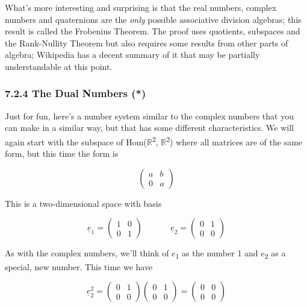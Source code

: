 \documentclass[oneside,english]{amsbook}
\numberwithin{section}{chapter}
\theoremstyle{plain}
\theoremstyle{definition}
\begin{document}
What's more interesting and surprising is that the real numbers, complex
numbers and quaternions are the \emph{only} possible associative
division algebras; this result is called the Frobenius Theorem. The
proof uses quotients, subspaces and the Rank-Nullity Theorem but also
requires some results from other parts of algebra; Wikipedia has a
decent summary of it that may be partially understandable at this point.

\subsubsection{7.2.4 The Dual Numbers (*)}\label{the-dual-numbers}

Just for fun, here's a number system similar to the complex numbers that
you can make in a similar way, but that has some different
characteristics. We will again start with the subspace of
Hom($\mathbb{R}$\textsuperscript{2}, $\mathbb{R}$\textsuperscript{2}) where
all matrices are of the same form, but this time the form is

\[\begin{pmatrix}
	a & b \\
	0 & a
\end{pmatrix}\]

This is a two-dimensional space with basis

\[{\underline{e}}_{1} = \begin{pmatrix}
	1 & 0 \\
	0 & 1
\end{pmatrix}\ \ \ \ \ \ \ \ \ \ \ \ \ \ \ {\underline{e}}_{2} = \begin{pmatrix}
	0 & 1 \\
	0 & 0
\end{pmatrix}\]

As with the complex numbers, we'll think of $e$\textsubscript{1} as
the number 1 and $e$\textsubscript{2} as a special, new number. This
time we have

\[{\underline{e}}_{2}^{2} = \begin{pmatrix}
	0 & 1 \\
	0 & 0
\end{pmatrix}\begin{pmatrix}
	0 & 1 \\
	0 & 0
\end{pmatrix} = \begin{pmatrix}
	0 & 0 \\
	0 & 0
\end{pmatrix}\]
\end{document}
